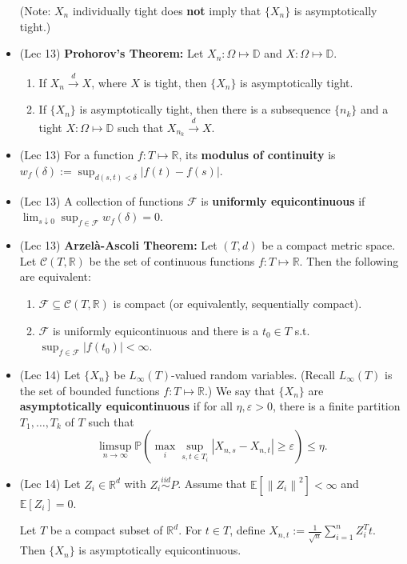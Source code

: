 \documentclass[twoside]{article}
\newcommand{\dis}{\displaystyle}
\newcommand{\norm}[1]{\left\|{#1}\right\|} %
\newcommand\bbD{\mathbb{D}}
\newcommand\bbE{\mathbb{E}}
\newcommand\bbP{\mathbb{P}}
\newcommand\bbR{\mathbb{R}}
\newcommand\calC{\mathcal{C}}
\newcommand\calF{\mathcal{F}}
\newcommand\dlt{\delta}
\def\eps{\varepsilon}
\newcommand\Om{\Omega}
\newcommand\cd{\stackrel{d}{\goesto}}
\newcommand\goesto{\rightarrow}
\begin{document}
\begin{itemize}
(Note: $X_n$ individually tight does \textbf{not} imply that $\{X_n\}$ is asymptotically tight.)

\item (Lec 13) \textbf{Prohorov's Theorem:} Let $X_n:\Om \mapsto \bbD$ and $X:\Om \mapsto \bbD$.
\begin{enumerate}
\item If $X_n \cd X$, where $X$ is tight, then $\{X_n\}$ is asymptotically tight.
\item If $\{X_n\}$ is asymptotically tight, then there is a subsequence $\{n_k\}$ and a tight $X:\Om \mapsto \bbD$ such that $X_{n_k} \cd X$.
\end{enumerate}

\item (Lec 13) For a function $f:T \mapsto \bbR$, its \textbf{modulus of continuity} is $w_f(\delta) := \dis\sup_{d(s,t)<\delta} |f(t)-f(s)|$.

\item (Lec 13) A collection of functions $\calF$ is \textbf{uniformly equicontinuous} if $\dis\lim_{s \downarrow 0}\sup_{f \in \calF} w_f(\dlt) = 0$.

\item (Lec 13) \textbf{Arzel\`{a}-Ascoli Theorem:} Let $(T,d)$ be a compact metric space. Let $\calC(T, \bbR)$ be the set of continuous functions $f: T \mapsto \bbR$. Then the following are equivalent:
\begin{enumerate}
\item  $\calF \subseteq \calC(T,\bbR)$ is compact (or equivalently, sequentially compact).
\item $\calF$ is uniformly equicontinuous and there is a $ t_0\in T$ s.t. $\dis\sup_{f \in \calF} |f(t_0)| <\infty$.
\end{enumerate}

\item (Lec 14) Let $\{X_n\}$ be $L_\infty(T)$-valued random variables. (Recall $L_\infty(T)$ is the set of bounded functions $f: T \mapsto \bbR$.) We say that $\{X_n\}$ are \textbf{asymptotically equicontinuous} if for all $\eta, \eps > 0$, there is a finite partition $T_1, \dots, T_k$ of $T$ such that 
\[ \limsup_{n \goesto \infty} \bbP \left( \max_i \sup_{s, t \in T_i} |X_{n, s} - X_{n, t}| \geq \eps\right) \leq \eta. \]

\item (Lec 14) Let $Z_i \in \bbR^d$ with $Z_i \stackrel{iid}{\sim} P$. Assume that $\bbE[\norm{Z_i}^2] < \infty$ and $\bbE[Z_i] = 0$.

Let $T$ be a compact subset of $\bbR^d$. For $t \in T$, define $X_{n, t} := \dis\frac{1}{\sqrt{n}} \sum_{i=1}^n Z_i^T t$. Then $\{X_n\}$ is asymptotically equicontinuous.


\end{itemize}
\end{document}
